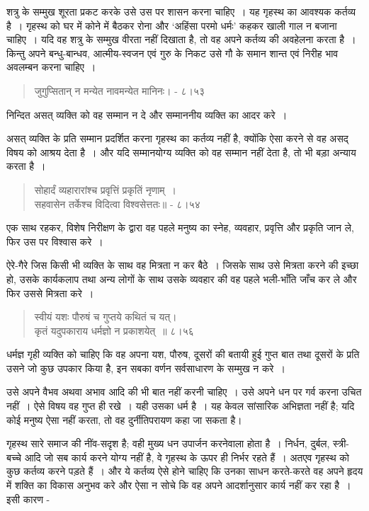 शत्रु के सम्मुख शूरता प्रकट करके उसे उस पर शासन करना चाहिए~। यह गृहस्थ का आवश्यक कर्तव्य है~। गृहस्थ को घर में कोने में बैठकर रोना और ‘अहिंसा परमो धर्मः’ कहकर खाली गाल न बजाना चाहिए~। यदि वह शत्रु के सम्मुख वीरता नहीं दिखाता है, तो वह अपने कर्तव्य की अवहेलना करता है~। किन्तु अपने बन्धु-बान्धव, आत्मीय-स्वजन एवं गुरु के निकट उसे गौ के समान शान्त एवं निरीह भाव अवलम्बन करना चाहिए~।

\begin{verse}
जुगुप्सितान् न मन्येत नावमन्येत मानिनः। - ८।५३
\end{verse}

निन्दित असत् व्यक्ति को वह सम्मान न दे और सम्माननीय व्यक्ति का आदर करे~।

असत् व्यक्ति के प्रति सम्मान प्रदर्शित करना गृहस्थ का कर्तव्य नहीं है, क्योंकि ऐसा करने से वह असद् विषय को आश्रय देता है~। और यदि सम्मानयोग्य व्यक्ति को वह सम्मान नहीं देता है, तो भी बड़ा अन्याय करता है~।

\begin{verse}
सोहार्दं व्यहारारांश्च प्रवृत्तिं प्रकृतिं नृणाम्~।\\ सहवासेन तर्केश्च विदित्वा विश्वसेत्ततः॥ - ८।५४
\end{verse}

एक साथ रहकर, विशेष निरीक्षण के द्वारा वह पहले मनुष्य का स्नेह, व्यवहार, प्रवृत्ति और प्रकृति जान ले, फिर उस पर विश्वास करे~।

ऐरे-गैरे जिस किसी भी व्यक्ति के साथ वह मित्रता न कर बैठे~। जिसके साथ उसे मित्रता करने की इच्छा हो, उसके कार्यकलाप तथा अन्य लोगों के साथ उसके व्यवहार की वह पहले भली-भाँति जाँच कर ले और फिर उससे मित्रता करे~।

\begin{verse}
स्वीयं यशः पौरुषं च गुप्तये कथितं च यत्।\\ कृतं यदुपकाराय धर्मज्ञो न प्रकाशयेत्~॥ ८।५६
\end{verse}

धर्मज्ञ गृही व्यक्ति को चाहिए कि वह अपना यश, पौरुष, दूसरों की बतायी हुई गुप्त बात तथा दूसरों के प्रति उसने जो कुछ उपकार किया है, इन सबका वर्णन सर्वसाधारण के सम्मुख न करे~।

उसे अपने वैभव अथवा अभाव आदि की भी बात नहीं करनी चाहिए~। उसे अपने धन पर गर्व करना उचित नहीं~। ऐसे विषय वह गुप्त ही रखे~। यही उसका धर्म है~। यह केवल सांसारिक अभिज्ञता नहीं है; यदि कोई मनुष्य ऐसा नहीं करता, तो वह दुर्नीतिपरायण कहा जा सकता है।

गृहस्थ सारे समाज की नींव-सदृश है; वही मुख्य धन उपार्जन करनेवाला होता है~। निर्धन, दुर्बल, स्त्री-बच्चे आदि जो सब कार्य करने योग्य नहीं है, वे गृहस्थ के ऊपर ही निर्भर रहते हैं~। अतएव गृहस्थ को कुछ कर्तव्य करने पड़ते हैं~। और ये कर्तव्य ऐसे होने चाहिए कि उनका साधन करते-करते वह अपने हृदय में शक्ति का विकास अनुभव करे और ऐसा न सोचे कि वह अपने आदर्शानुसार कार्य नहीं कर रहा है~। इसी कारण -

